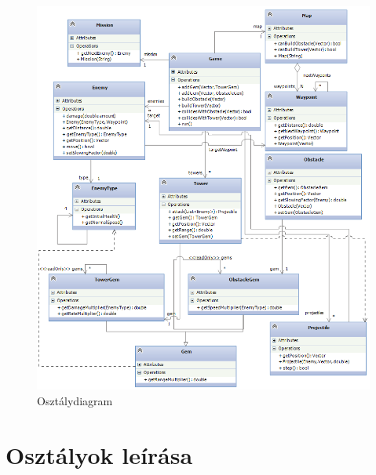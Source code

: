 \begin{figure}[H]
\begin{center}
\includegraphics[width=177mm]{images/ch04/class.png}
\caption{Osztálydiagram}
\label{fig:class_diag}
\end{center}
\end{figure}


\section{Osztályok leírása}


